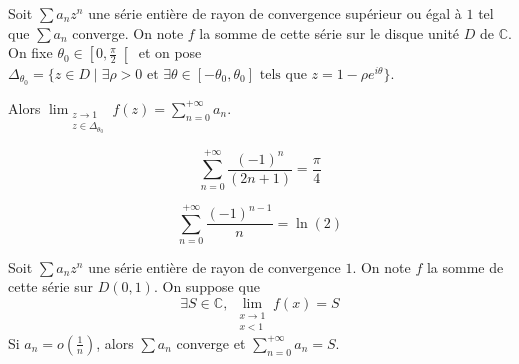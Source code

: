 	\begin{theorem}
		\label{abel-angulaire}
		Soit $\sum a_n z^n$ une série entière de rayon de convergence supérieur ou égal à $1$ tel que $\sum a_n$ converge. On note $f$ la somme de cette série sur le disque unité $D$ de $\mathbb{C}$. On fixe $\theta_0 \in \left[ 0, \frac{\pi}{2} \right[$ et on pose $\Delta_{\theta_0} = \{ z \in D \mid \exists \rho > 0 \text{ et } \exists \theta \in [-\theta_0, \theta_0] \text{ tels que } z = 1 - \rho e^{i\theta} \}$.
		\begin{center}
		\end{center}
		Alors $\lim_{\substack{z \rightarrow 1 \\ z \in \Delta_{\theta_0}}} f(z) = \sum_{n=0}^{+\infty} a_n$.
	\end{theorem}
	
	\begin{application}
		\[ \sum_{n=0}^{+\infty} \frac{(-1)^n}{(2n+1)} = \frac{\pi}{4} \]
	\end{application}
	
	\begin{application}
		\[ \sum_{n=0}^{+\infty} \frac{(-1)^{n-1}}{n} = \ln(2) \]
	\end{application}
	
	\begin{theorem}
		Soit $\sum a_n z^n$ une série entière de rayon de convergence $1$. On note $f$ la somme de cette série sur $D(0,1)$. On suppose que
		\[ \exists S \in \mathbb{C}, \, \lim_{\substack{x \rightarrow 1 \\ x < 1}} f(x) = S \]
		Si $a_n = o \left( \frac{1}{n} \right)$, alors $\sum a_n$ converge et $\sum_{n=0}^{+\infty} a_n = S$.
	\end{theorem}
	
